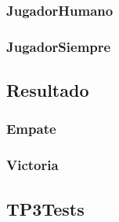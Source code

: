 \documentclass[a4paper, 10pt, twoside]{article}
\begin{document}
    \subsubsection{JugadorHumano}
    

    \subsubsection{JugadorSiempre}
    

\subsection{Resultado}


    \subsubsection{Empate}
    

    \subsubsection{Victoria}
    

\subsection{TP3Tests}

\end{document}
